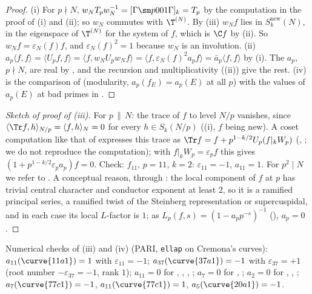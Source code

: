 \begin{proof}
(i) For $p\nmid N$, $w_NT_pw_N^{-1}=[\Gamma\sm p001\Gamma]_k=T_p$ by the computation in the proof of (i) and (ii); so $w_N$ commutes
with $\T^{(N)}$. By (iii) $w_Nf$ lies in $S_k^{\mathrm{new}}(N)$, in the eigenspace of $\T^{(N)}$ for the system of $f$, which is $\C f$ by (ii). So
$w_Nf=\varepsilon_N(f) f$, and $\varepsilon_N(f)^2=1$ because $w_N$ is an involution. (ii) $a_p\langle f,f\rangle=\langle U_pf,f\rangle=\langle f,w_NU_pw_Nf\rangle=\langle f,\varepsilon_N(f)^2a_pf\rangle=\bar a_p\langle f,f\rangle$ by (i). The
$a_p$, $p\nmid N$, are real by , and the recursion and multiplicativity ((ii)) give the rest. (iv) is the comparison of
 (modularity, $a_p(f_E)=a_p(E)$ at all $p$) with the values of $a_p(E)$ at bad primes in .
\end{proof}

\begin{proof}[Sketch of proof of (iii)]
For $p\,\|\,N$: the trace of $f$ to level $N/p$ vanishes, since $\langle\Tr f,h\rangle_{N/p}=\langle f,h\rangle_N=0$ for every $h\in S_k(N/p)$ ((i), $f$ being new). A coset computation
like that of  expresses this trace as $\Tr f=f+p^{1-k/2}U_p(f|_kW_p)$ (\cite{AtkinLehner70}, \cite{Li75}; we do not reproduce the computation); with
$f|_kW_p=\varepsilon_pf$ this gives $(1+p^{1-k/2}\varepsilon_pa_p)f=0$. Check: $f_{11}$, $p=11$, $k=2$: $\varepsilon_{11}=-1$, $a_{11}=1$. For $p^2\mid N$ we refer to \cite[Theorem 3]{AtkinLehner70}. A conceptual reason, through
: the local component of $f$ at $p$ has trivial central character and conductor exponent at least $2$, so it is a ramified principal series, a ramified
twist of the Steinberg representation or supercuspidal, and in each case its local $L$-factor is $1$; as $L_p(f,s)=(1-a_pp^{-s})^{-1}$ (), $a_p=0$.
\end{proof}

Numerical checks of (iii) and (iv) (PARI, \texttt{ellap} on Cremona's curves): $a_{11}(\curve{11a1})=1$ with $\varepsilon_{11}=-1$; $a_{37}(\curve{37a1})=-1$ with $\varepsilon_{37}=+1$ (root number
$-\varepsilon_{37}=-1$, rank $1$); $a_{11}=0$ for , , , ; $a_7=0$ for , ; $a_2=0$ for , , ;
$a_7(\curve{77c1})=-1$, $a_{11}(\curve{77c1})=1$, $a_5(\curve{20a1})=-1$.

